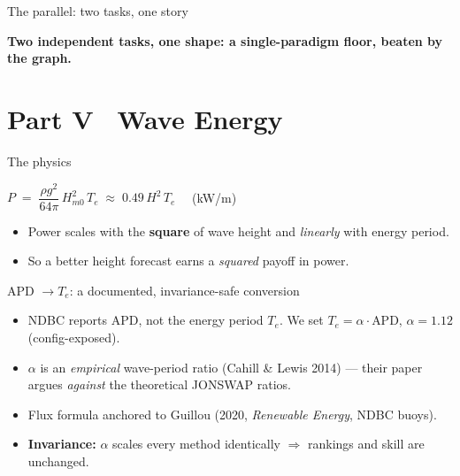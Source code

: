 \documentclass[aspectratio=169]{beamer}
\newcommand{\take}[1]{\vspace{0.6ex}\begin{center}\textbf{\color{colgraph}#1}\end{center}}
\begin{document}
\begin{frame}{The parallel: two tasks, one story}
  \begin{center}
  \end{center}
  \take{Two independent tasks, one shape: a single-paradigm floor, beaten by the graph.}
\end{frame}

\section{Part V \textperiodcentered\ Wave Energy}

\begin{frame}{The physics}
  \begin{center}\large
  $P \;=\; \dfrac{\rho g^{2}}{64\pi}\, H_{m0}^{2}\, T_e \;\approx\; 0.49\, H^{2}\, T_e \quad$ (kW/m)
  \end{center}
  \begin{itemize}
    \item Power scales with the \textbf{square} of wave height and \emph{linearly} with energy period.
    \item So a better height forecast earns a \emph{squared} payoff in power.
  \end{itemize}
\end{frame}

\begin{frame}{APD $\rightarrow T_e$: a documented, invariance-safe conversion}
  \begin{itemize}
    \item NDBC reports APD, not the energy period $T_e$. We set $T_e=\alpha\cdot\text{APD}$, $\alpha=1.12$ (config-exposed).
    \item $\alpha$ is an \emph{empirical} wave-period ratio (Cahill \& Lewis 2014) --- their paper argues \emph{against} the theoretical JONSWAP ratios.
    \item Flux formula anchored to Guillou (2020, \emph{Renewable Energy}, NDBC buoys).
    \item \textbf{Invariance:} $\alpha$ scales every method identically $\Rightarrow$ rankings and skill are unchanged.
  \end{itemize}
\end{frame}
\end{document}
